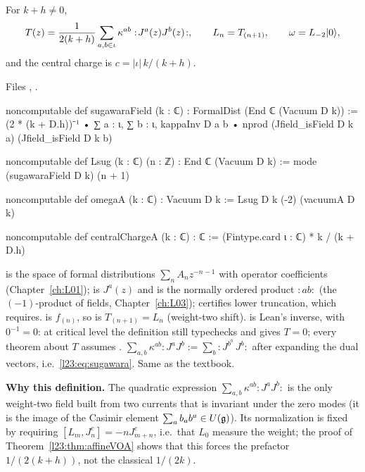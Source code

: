 \begin{definition}\label{l23:def:sugawara}
For $k+h\neq0$,
\begin{equation*}
T(z)=\frac{1}{2(k+h)}\sum_{a,b\in\iota}\kappa^{ab}:\!J^a(z)J^b(z)\!:,\qquad L_n=T_{(n+1)},\qquad \omega=L_{-2}|0\rangle,
\end{equation*}
and the central charge is $c=|\iota|\,k/(k+h)$.
\end{definition}
\noindent Files ,
.
\begin{leancode}
noncomputable def sugawaraField (k : ℂ) : FormalDist (End ℂ (Vacuum D k)) :=
  (2 * (k + D.h))⁻¹ •
    ∑ a : ι, ∑ b : ι,
      kappaInv D a b • nprod (Jfield_isField D k a) (Jfield_isField D k b)

noncomputable def Lsug (k : ℂ) (n : ℤ) : End ℂ (Vacuum D k) :=
  mode (sugawaraField D k) (n + 1)

noncomputable def omegaA (k : ℂ) : Vacuum D k := Lsug D k (-2) (vacuumA D k)

noncomputable def centralChargeA (k : ℂ) : ℂ := (Fintype.card ι : ℂ) * k / (k + D.h)
\end{leancode}

\begin{dictionary}
 is the space of formal distributions $\sum_n A_nz^{-n-1}$ with operator coefficients
(Chapter~\ref{ch:L01});  is $J^a(z)$ and  is the normally ordered product $:\!ab\!:$
(the $(-1)$-product of fields, Chapter~\ref{ch:L03});  certifies lower truncation, which
 requires.  is $f_{(n)}$, so  is $T_{(n+1)}=L_n$ (weight-two shift).
 is Lean's inverse, with $0^{-1}=0$: at critical level the definition still typechecks and
gives $T=0$; every theorem about $T$ assumes . $\sum_{a,b}\kappa^{ab}:\!J^aJ^b\!:=\sum_b:\!J^{b^b}\,J^b\!:$
after expanding the dual vectors, i.e.\ \eqref{l23:eq:sugawara}. Same as the textbook.
\end{dictionary}

\textbf{Why this definition.} The quadratic expression $\sum_{a,b}\kappa^{ab}:\!J^aJ^b\!:$ is the only weight-two field built
from two currents that is invariant under the zero modes (it is the image of the Casimir element
$\sum_ab_ab^a\in U(\mathfrak g)$). Its normalization is fixed by requiring $[L_m,J^c_n]=-nJ^c_{m+n}$, i.e.\ that $L_0$ measure
the weight; the proof of Theorem~\ref{l23:thm:affineVOA} shows that this forces the prefactor $1/(2(k+h))$, not the classical $1/(2k)$.

